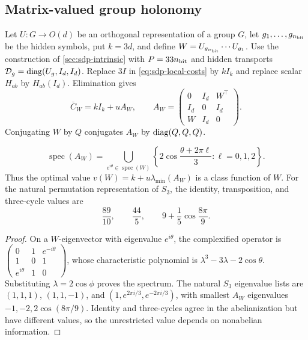 \subsection{Matrix-valued group holonomy}
\label{sec:sdp-group-holonomy}

Let $U:G\to O(d)$ be an orthogonal representation
of a group $G$, let $g_1,\ldots,g_{n_{\rm bit}}$ be the hidden symbols, put
$k=3d$, and define $W=U_{g_{n_{\rm bit}}}\cdots U_{g_1}$.  Use the
construction of \cref{sec:sdp-intrinsic} with
$P=33n_{\rm bit}$ and hidden transports
$\mathcal D_g=\operatorname{diag}(U_g,I_d,I_d)$.  Replace $3I$ in
\eqref{eq:sdp-local-costs} by $kI_k$ and replace scalar $H_{ab}$ by
$H_{ab}(I_d)$.  Elimination gives
\begin{equation}
 \overline C_W=kI_k+uA_W,\qquad
 A_W=\begin{pmatrix}0&I_d&W^\top\\I_d&0&I_d\\W&I_d&0\end{pmatrix}.          \label{eq:sdp-group-cost}
\end{equation}
Conjugating $W$ by $Q$ conjugates $A_W$ by $\operatorname{diag}(Q,Q,Q)$.

\begin{theorem}
\label{thm:sdp-holonomy-spectrum}
\begin{equation}
 \operatorname{spec}(A_W)=
 \bigcup_{e^{i\theta}\in\operatorname{spec}(W)}
 \left\{2\cos\frac{\theta+2\pi\ell}{3}:\ell=0,1,2\right\}.              \label{eq:sdp-holonomy-spectrum}
\end{equation}
Thus the optimal value $v(W)=k+u\lambda_{\min}(A_W)$ is a class function
of $W$.  For the
natural permutation representation of $S_3$, the identity, transposition,
and three-cycle values are
\begin{equation}
 \frac{89}{10},\qquad \frac{44}{5},\qquad
 9+\frac15\cos\frac{8\pi}{9}.                             \label{eq:sdp-s3-values}
\end{equation}
\end{theorem}

\begin{proof}
On a $W$-eigenvector with eigenvalue $e^{i\theta}$, the complexified operator
is $\left(\begin{smallmatrix}0&1&e^{-i\theta}\\1&0&1\\e^{i\theta}&1&0\end{smallmatrix}\right)$,
whose characteristic polynomial is $\lambda^3-3\lambda-2\cos\theta$.
Substituting $\lambda=2\cos\phi$ proves the spectrum.  The natural $S_3$
eigenvalue lists are $(1,1,1)$, $(1,1,-1)$, and
$(1,e^{2\pi i/3},e^{-2\pi i/3})$, with smallest $A_W$ eigenvalues $-1,-2,2\cos(8\pi/9)$.  Identity and three-cycles agree in the abelianization
but have different values, so the unrestricted value depends on
nonabelian information.
\end{proof}

